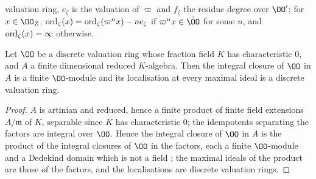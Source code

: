 \begin{definition}
\begin{enumerate}[label=(\roman*)]
valuation ring, $e_\zeta$ is the valuation of $\varpi$ and $f_\zeta$ the residue degree over $\OO'$; for
$x\in\OO_Z$, $\operatorname{ord}_\zeta(x)=\operatorname{ord}_\zeta(\varpi^nx)-ne_\zeta$ if $\varpi^nx\in\bar\OO$ for some $n$, and
$\operatorname{ord}_\zeta(x)=\infty$ otherwise.
\end{enumerate}
\end{definition}

\begin{lemma}\label{pf:onto1:intclos}
Let $\OO$ be a discrete valuation ring whose fraction field $K$ has characteristic $0$, and $A$ a finite
dimensional reduced $K$-algebra. Then the integral closure of $\OO$ in $A$ is a finite $\OO$-module and its
localisation at every maximal ideal is a discrete valuation ring.
\end{lemma}

\begin{proof}
$A$ is artinian and reduced, hence a finite product of finite field extensions $A/\mathfrak m$ of $K$, separable
since $K$ has characteristic $0$; the idempotents separating the factors are integral over $\OO$. Hence the
integral closure of $\OO$ in $A$ is the product of the integral closures of $\OO$ in the factors, each a finite
$\OO$-module and a Dedekind domain which is not a field \cite[Ch.~I, \S4]{Serre1979}; the maximal ideals of the
product are those of the factors, and the localisations are discrete valuation rings.
\end{proof}

